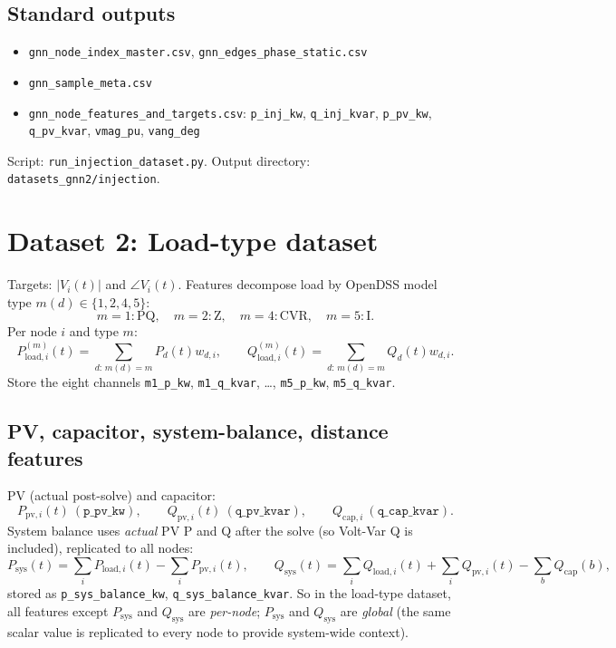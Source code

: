 \documentclass[11pt]{article}
\begin{document}
\subsection*{Standard outputs}

\begin{itemize}[noitemsep]
\item \texttt{gnn\_node\_index\_master.csv}, \texttt{gnn\_edges\_phase\_static.csv}
\item \texttt{gnn\_sample\_meta.csv}
\item \texttt{gnn\_node\_features\_and\_targets.csv}: \texttt{p\_inj\_kw}, \texttt{q\_inj\_kvar}, \texttt{p\_pv\_kw}, \texttt{q\_pv\_kvar}, \texttt{vmag\_pu}, \texttt{vang\_deg}
\end{itemize}
Script: \texttt{run\_injection\_dataset.py}. Output directory: \texttt{datasets\_gnn2/injection}.

\section{Dataset 2: Load-type dataset}

Targets: $|V_i(t)|$ and $\angle V_i(t)$. Features decompose load by OpenDSS model type
$m(d)\in\{1,2,4,5\}$:
\[
m=1:\text{PQ},\quad m=2:\text{Z},\quad m=4:\text{CVR},\quad m=5:\text{I}.
\]
Per node $i$ and type $m$:
\[
P^{(m)}_{\mathrm{load},i}(t)=\sum_{d:\,m(d)=m}P_d(t)w_{d,i},\qquad
Q^{(m)}_{\mathrm{load},i}(t)=\sum_{d:\,m(d)=m}Q_d(t)w_{d,i}.
\]
Store the eight channels \texttt{m1\_p\_kw}, \texttt{m1\_q\_kvar}, \dots, \texttt{m5\_p\_kw},
\texttt{m5\_q\_kvar}.

\subsection*{PV, capacitor, system-balance, distance features}

PV (actual post-solve) and capacitor:
\[
P_{\mathrm{pv},i}(t)\ (\texttt{p\_pv\_kw}),\qquad
Q_{\mathrm{pv},i}(t)\ (\texttt{q\_pv\_kvar}),\qquad
Q_{\mathrm{cap},i}\ (\texttt{q\_cap\_kvar}).
\]
System balance uses \emph{actual} PV P and Q after the solve (so Volt-Var Q is included), replicated to all nodes:
\[
P_{\mathrm{sys}}(t)=\sum_i P_{\mathrm{load},i}(t)-\sum_i P_{\mathrm{pv},i}(t),\qquad
Q_{\mathrm{sys}}(t)=\sum_i Q_{\mathrm{load},i}(t)+\sum_i Q_{\mathrm{pv},i}(t)-\sum_b Q_{\mathrm{cap}}(b),
\]
stored as \texttt{p\_sys\_balance\_kw}, \texttt{q\_sys\_balance\_kvar}. So in the load-type dataset, all features except $P_{\mathrm{sys}}$ and $Q_{\mathrm{sys}}$ are \emph{per-node}; $P_{\mathrm{sys}}$ and $Q_{\mathrm{sys}}$ are \emph{global} (the same scalar value is replicated to every node to provide system-wide context).
\end{document}
